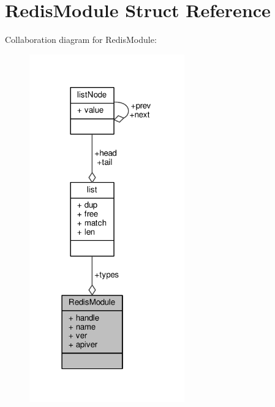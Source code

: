 \hypertarget{structRedisModule}{}\section{Redis\+Module Struct Reference}
\label{structRedisModule}


Collaboration diagram for Redis\+Module\+:\nopagebreak
\begin{figure}[H]
\begin{center}
\leavevmode
\includegraphics[width=190pt]{structRedisModule__coll__graph}
\end{center}
\end{figure}
